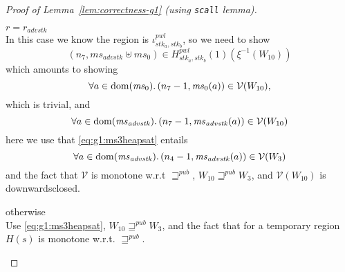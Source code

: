 \documentclass[a4paper]{article}
\DeclareMathOperator{\dom}{dom}
\newcommand{\var}[1]{\mathit{#1}}
\newcommand{\hs}{\var{ms}}
\newcommand{\ms}{\hs}
\newcommand{\adv}{\var{adv}}
\newcommand{\stk}{\var{stk}}
\newcommand{\pwl}{\var{pwl}}
\newcommand{\futurewk}{\mathbin{\sqsupseteq}^{\var{pub}}}
\newcommand{\asmType}{\plaindom{AsmType}}
\newcommand{\plaindom}[1]{\mathrm{#1}}
\newcommand{\intr}[2]{\mathcal{#1}}
\newcommand{\valueintr}[1]{\intr{V}{#1}}
\newcommand{\stdvr}{\valueintr{\asmType}}
\newcommand{\npair}[2][n]{\left(#1,#2 \right)}
\begin{document}
\begin{proof}[Proof of Lemma~\ref{lem:correctness-g1} (using \texttt{scall} lemma)]
\begin{enumproof}[resume]
\begin{enumproof}
\begin{enumproof}
\begin{enumproof}
                \item $r = r_{\adv \stk}$ \\
                  In this case we know the region is $\iota^\pwl_{\stk_a,\stk_b}$, so we need to show
                  \[
                    \npair[n_7]{\ms_{\adv \stk} \uplus \ms_0} \in H^\pwl_{\stk_a,\stk_b}(1)(\xi^{-1}(W_{10}))
                  \]
                  which amounts to showing
                  \[
                    \forall a \in \dom(\ms_0) \ldotp  \npair[n_7-1]{\ms_0(a)} \in \stdvr(W_{10}),
                  \]
                  which is trivial, and
                  \[
                    \forall a \in \dom(\ms_{\adv \stk}) \ldotp \npair[n_7-1]{\ms_{\adv \stk}(a)} \in \stdvr(W_{10})
                  \]
                  here we use that \ref{eq:g1:ms3heapsat} entails
                  \[
                    \forall a \in \dom(\ms_{\adv \stk}) \ldotp \npair[n_4-1]{\ms_{\adv \stk}(a)} \in \stdvr(W_3)
                  \]
                  and the fact that $\stdvr$ is monotone w.r.t $\futurewk$, $W_{10} \futurewk W_3$, and $\stdvr(W_{10})$ is downwardsclosed.
                \item otherwise \\
                  Use \ref{eq:g1:ms3heapsat}, $W_{10} \futurewk W_3$, and the fact that for a temporary region $H(s)$ is monotone w.r.t. $\futurewk$.
              \end{enumproof}
              

\end{enumproof}
\end{enumproof}
\end{enumproof}
\end{proof}
\end{document}
